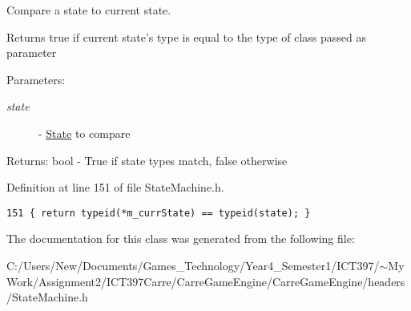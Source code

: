 Compare a state to current state. 

Returns true if current state's type is equal to the type of class passed as parameter

\begin{Desc}
\item[Parameters:]
\begin{description}
\item[{\em state}]- \hyperlink{class_state}{State} to compare\end{description}
\end{Desc}
\begin{Desc}
\item[Returns:]bool - True if state types match, false otherwise \end{Desc}


Definition at line 151 of file StateMachine.h.

\begin{Code}\begin{verbatim}151 { return typeid(*m_currState) == typeid(state); }
\end{verbatim}
\end{Code}




The documentation for this class was generated from the following file:\begin{CompactItemize}
\item 
C:/Users/New/Documents/Games\_\-Technology/Year4\_\-Semester1/ICT397/$\sim$My Work/Assignment2/ICT397Carre/CarreGameEngine/CarreGameEngine/headers/StateMachine.h\end{CompactItemize}
